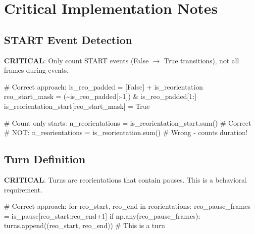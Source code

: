 \documentclass[
  11pt,
]{article}
\newenvironment{Shaded}{\begin{snugshade}}{\end{snugshade}}
\newcommand{\BuiltInTok}[1]{\textcolor[rgb]{0.00,0.23,0.31}{#1}}
\newcommand{\CommentTok}[1]{\textcolor[rgb]{0.37,0.37,0.37}{#1}}
\newcommand{\ControlFlowTok}[1]{\textcolor[rgb]{0.00,0.23,0.31}{#1}}
\newcommand{\DecValTok}[1]{\textcolor[rgb]{0.68,0.00,0.00}{#1}}
\newcommand{\KeywordTok}[1]{\textcolor[rgb]{0.00,0.23,0.31}{#1}}
\newcommand{\NormalTok}[1]{\textcolor[rgb]{0.00,0.23,0.31}{#1}}
\newcommand{\OperatorTok}[1]{\textcolor[rgb]{0.37,0.37,0.37}{#1}}
\newcommand{\VariableTok}[1]{\textcolor[rgb]{0.07,0.07,0.07}{#1}}
\begin{document}
\hypertarget{critical-implementation-notes}{%
\section{Critical Implementation
Notes}\label{critical-implementation-notes}}

\hypertarget{start-event-detection}{%
\subsection{START Event Detection}\label{start-event-detection}}

\textbf{CRITICAL}: Only count START events (False \(\rightarrow\) True
transitions), not all frames during events.

\begin{Shaded}
\begin{Highlighting}[]
\CommentTok{\# Correct approach:}
\NormalTok{is\_reo\_padded }\OperatorTok{=}\NormalTok{ [}\VariableTok{False}\NormalTok{] }\OperatorTok{+}\NormalTok{ is\_reorientation}
\NormalTok{reo\_start\_mask }\OperatorTok{=}\NormalTok{ (}\OperatorTok{\textasciitilde{}}\NormalTok{is\_reo\_padded[:}\OperatorTok{{-}}\DecValTok{1}\NormalTok{]) }\OperatorTok{\&}\NormalTok{ is\_reo\_padded[}\DecValTok{1}\NormalTok{:]}
\NormalTok{is\_reorientation\_start[reo\_start\_mask] }\OperatorTok{=} \VariableTok{True}

\CommentTok{\# Count only starts:}
\NormalTok{n\_reorientations }\OperatorTok{=}\NormalTok{ is\_reorientation\_start.}\BuiltInTok{sum}\NormalTok{()  }\CommentTok{\# Correct}
\CommentTok{\# NOT: n\_reorientations = is\_reorientation.sum()  \# Wrong {-} counts duration!}
\end{Highlighting}
\end{Shaded}

\hypertarget{turn-definition}{%
\subsection{Turn Definition}\label{turn-definition}}

\textbf{CRITICAL}: Turns are reorientations that contain pauses. This is
a behavioral requirement.

\begin{Shaded}
\begin{Highlighting}[]
\CommentTok{\# Correct approach:}
\ControlFlowTok{for}\NormalTok{ reo\_start, reo\_end }\KeywordTok{in}\NormalTok{ reorientations:}
\NormalTok{    reo\_pause\_frames }\OperatorTok{=}\NormalTok{ is\_pause[reo\_start:reo\_end}\OperatorTok{+}\DecValTok{1}\NormalTok{]}
    \ControlFlowTok{if}\NormalTok{ np.}\BuiltInTok{any}\NormalTok{(reo\_pause\_frames):}
\NormalTok{        turns.append((reo\_start, reo\_end))  }\CommentTok{\# This is a turn}
\end{Highlighting}
\end{Shaded}
\end{document}
